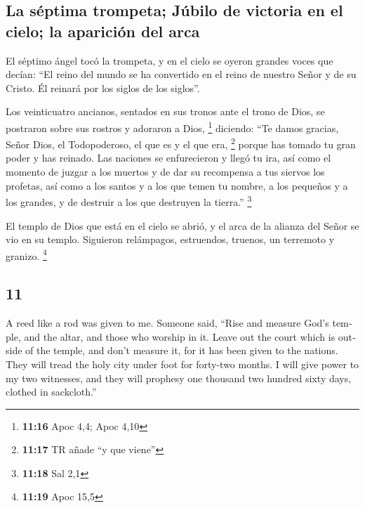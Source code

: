 \begin{paracol}{2}
\hypertarget{la-suxe9ptima-trompeta-juxfabilo-de-victoria-en-el-cielo-la-apariciuxf3n-del-arca}{%
\subsection{La séptima trompeta; Júbilo de victoria en el cielo; la
aparición del
arca}\label{la-suxe9ptima-trompeta-juxfabilo-de-victoria-en-el-cielo-la-apariciuxf3n-del-arca}}

 El séptimo ángel tocó la trompeta, y en el cielo se
oyeron grandes voces que decían: ``El reino del mundo se ha convertido
en el reino de nuestro Señor y de su Cristo. Él reinará por los siglos
de los siglos''.

 Los veinticuatro ancianos, sentados en sus tronos ante
el trono de Dios, se postraron sobre sus rostros y adoraron a Dios,
\footnote{\textbf{11:16} Apoc 4,4; Apoc 4,10}  diciendo:
``Te damos gracias, Señor Dios, el Todopoderoso, el que es y el que era,
\footnote{\textbf{11:17} TR añade ``y que viene''} porque has tomado tu
gran poder y has reinado.  Las naciones se enfurecieron y
llegó tu ira, así como el momento de juzgar a los muertos y de dar su
recompensa a tus siervos los profetas, así como a los santos y a los que
temen tu nombre, a los pequeños y a los grandes, y de destruir a los que
destruyen la tierra.'' \footnote{\textbf{11:18} Sal 2,1}

 El templo de Dios que está en el cielo se abrió, y el
arca de la alianza del Señor se vio en su templo. Siguieron relámpagos,
estruendos, truenos, un terremoto y granizo. \footnote{\textbf{11:19}
  Apoc 15,5}

\switchcolumn
\begin{otherlanguage}{english}

\hypertarget{section-21}{%
\section{11}\label{section-21}}

 A reed like a rod was given to me. Someone said, ``Rise
and measure God's temple, and the altar, and those who worship in it.
 Leave out the court which is outside of the temple, and
don't measure it, for it has been given to the nations. They will tread
the holy city under foot for forty-two months.  I will
give power to my two witnesses, and they will prophesy one thousand two
hundred sixty days, clothed in sackcloth.''


\end{otherlanguage}
\end{paracol}
